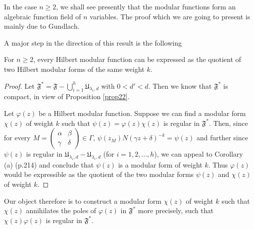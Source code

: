 In the case $n\geq 2$, we shall see presently that the modular
functions form an algebraic function field of $n$ variables. The proof
which we are going to present is mainly due to Gundlach.

A major step in the direction of this result is the following

\begin{lemma*}
For $n\geq 2$, every Hilbert modular function can be expressed as the
quotient of two Hilbert modular forms of the same weight $k$.
\end{lemma*}

\begin{proof}
Let
$\mathfrak{F}^{\ast}=\mathfrak{F}-\bigcup\limits^{h}_{i=1}\mathfrak{U}_{\lambda_{i},d}$
with $0<d'<d$. Then we know that $\mathfrak{F}^{\ast}$ is compact, in
view of Proposition \ref{prop22}.

Let $\varphi(z)$ be a Hilbert modular function. Suppose we can find a
modular form $\chi(z)$ of weight $k$ such that
$\psi(z)=\varphi(z)\chi(z)$ is regular in $\mathfrak{F}^{\ast}$. Then,
since for every $M=\left(\begin{smallmatrix}\alpha & \beta\\ \gamma &
  \delta
\end{smallmatrix}\right)\in\Gamma$, $\psi(z_{M})N(\gamma
z+\delta)^{-k}=\psi(z)$ and further since $\psi(z)$ is regular in
$\mathfrak{U}_{\lambda_{i},d}-\mathfrak{U}_{\lambda_{i},d}$ (for
$i=1,2,\ldots,h$), we can appeal to Corollary (a) (p.\@ 214) and
conclude that $\psi(z)$ is a modular form of weight $k$. Thus
$\varphi(z)$ would be expressible as the quotient of the two modular
forms $\psi(z)$ and $\chi(z)$ of weight $k$.
\end{proof}

Our object therefore is to construct a modular form $\chi(z)$ of
weight $k$ such that $\chi(z)$ annihilates the poles of $\varphi(z)$
in $\mathfrak{F}^{\ast}$ \ie more precisely, such that
$\chi(z)\varphi(z)$ is regular in $\mathfrak{F}^{\ast}$.

